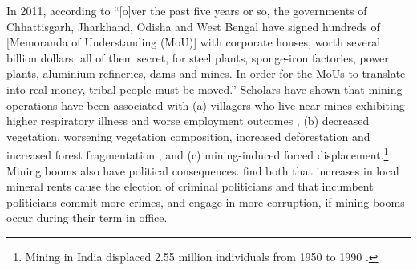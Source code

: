 \documentclass[12pt,reqno]{article}
\begin{document}



In 2011, according to \textcite{roy2011walking} ``[o]ver the past five years or so, the governments of Chhattisgarh, Jharkhand, Odisha and West Bengal have signed hundreds of [Memoranda of Understanding (MoU)] with corporate houses, worth several billion dollars, all of them secret, for steel plants, sponge-iron factories, power plants, aluminium refineries, dams and mines. In order for the MoUs to translate into real money, tribal people must be moved.'' Scholars have shown that mining  operations have been associated with (a) villagers who live near mines exhibiting higher respiratory illness and worse employment outcomes \parencite{saha2011under}, (b) decreased vegetation, worsening vegetation composition, increased deforestation and increased forest fragmentation \parencite{areendran2013land}, and (c) mining-induced forced displacement.\footnote{Mining in India displaced 2.55 million individuals from 1950 to 1990 \parencite[p. 3]{downing2002avoiding}.} Mining booms also have political consequences. \textcite{asher2019rent} find both that increases in local mineral rents cause the election of criminal politicians and that incumbent politicians commit more crimes, and engage in more corruption, if mining booms occur during their term in office.
\end{document}
